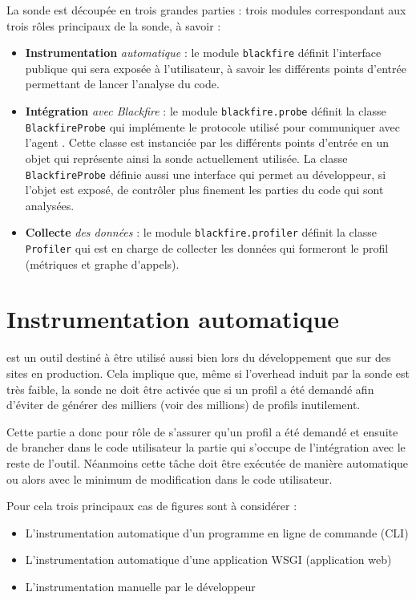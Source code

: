 La sonde est découpée en trois grandes parties : trois modules correspondant aux trois rôles principaux de la sonde, à savoir :
\begin{itemize}
\item \textbf{Instrumentation} \emph{automatique} : le module \texttt{blackfire} définit l'interface publique qui sera exposée à l'utilisateur, à savoir les différents points d'entrée permettant de lancer l'analyse du code.
\item \textbf{Intégration} \emph{avec Blackfire} : le module \texttt{blackfire.probe} définit la classe \\\texttt{BlackfireProbe} qui implémente le protocole utilisé pour communiquer avec l'agent \Blackfire. Cette classe est instanciée par les différents points d'entrée en un objet qui représente ainsi la sonde actuellement utilisée. La classe \texttt{BlackfireProbe} définie aussi une interface qui permet au développeur, si l'objet est exposé, de contrôler plus finement les parties du code qui sont analysées.
\item \textbf{Collecte} \emph{des données} : le module \texttt{blackfire.profiler} définit la classe \texttt{Profiler} qui est en charge de collecter les données qui formeront le profil (\gls{métriques} et \gls{graphe d'appels}).
\end{itemize}

  \chapter[Instrumentation]{Instrumentation automatique}
\Blackfire est un outil destiné à être utilisé aussi bien lors du développement que sur des sites en production. Cela implique que, même si l'\gls{overhead} induit par la sonde est très faible, la sonde ne doit être activée que si un profil a été demandé afin d'éviter de générer des milliers (voir des millions) de profils inutilement.

Cette partie a donc pour rôle de s'assurer qu'un profil a été demandé et ensuite de brancher dans le \gls{code utilisateur} la partie qui s'occupe de l'intégration avec le reste de l'outil. Néanmoins cette tâche doit être exécutée de manière automatique ou alors avec le minimum de modification dans le code utilisateur.

Pour cela trois principaux cas de figures sont à considérer :
\begin{itemize}
\item L'instrumentation automatique d'un programme en ligne de commande (\gls{CLI})
\item L'instrumentation automatique d'une application \gls{WSGI} (application web)
\item L'instrumentation manuelle par le développeur
\end{itemize}

